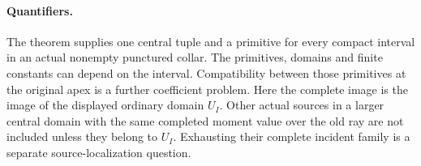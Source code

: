 \paragraph{Quantifiers.}
The theorem supplies one central tuple and a
primitive for every compact interval in an
actual nonempty punctured collar.  The
primitives, domains and finite constants can
depend on the interval.  Compatibility
between those primitives at the original
apex is a further coefficient problem.
Here the complete image is the image of
the displayed ordinary domain \(U_I\).
Other actual sources in a larger central
domain with the same completed moment
value over the old ray are not included
unless they belong to \(U_I\).  Exhausting
their complete incident family is a
separate source-localization question.

